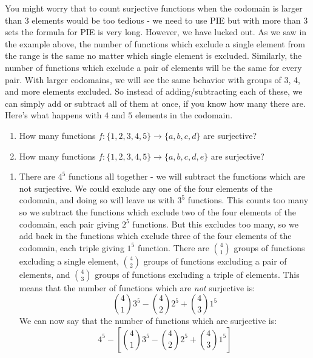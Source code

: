 \documentclass[12pt]{article}
\begin{document}
You might worry that to count surjective functions when the codomain is larger than 3 elements would be too tedious - we need to use PIE but with more than 3 sets the formula for PIE is very long.  However, we have lucked out.  As we saw in the example above, the number of functions which exclude a single element from the range is the same no matter which single element is excluded.  Similarly, the number of functions which exclude a pair of elements will be the same for every pair.  With larger codomains, we will see the same behavior with groups of 3, 4, and more elements excluded.  So instead of adding/subtracting each of these, we can simply add or subtract all of them at once, if you know how many there are.  Here's what happens with $4$ and $5$ elements in the codomain.

\begin{example}
  \begin{enumerate}
    \item How many functions $f: \{1,2,3,4,5\} \to \{a,b,c,d\}$ are surjective?
    \item How many functions $f: \{1,2,3,4,5\} \to \{a,b,c,d,e\}$ are surjective?
  \end{enumerate}
\begin{solution}
  \begin{enumerate}
    \item There are $4^5$ functions all together - we will subtract the functions which are not surjective.  We could exclude any one of the four elements of the codomain, and doing so will leave us with $3^5$ functions.  This counts too many so we subtract the functions which exclude two of the four elements of the codomain, each pair giving $2^5$ functions.  But this excludes too many, so we add back in the functions which exclude three of the four elements of the codomain, each triple giving $1^5$ function.  There are ${4 \choose 1}$ groups of functions excluding a single element, ${4 \choose 2}$ groups of functions excluding a pair of elements, and ${4 \choose 3}$ groups of functions excluding a triple of elements.  This means that the number of functions which are {\em not} surjective is:
    \[{4 \choose 1}3^5 - {4 \choose 2}2^5 + {4 \choose 3}1^5\]
    We can now say that the number of functions which are surjective is:
    \[4^5 - \left[{4 \choose 1}3^5 - {4 \choose 2}2^5 + {4 \choose 3}1^5\right]\]
    

\end{enumerate}
\end{solution}
\end{example}
\end{document}
